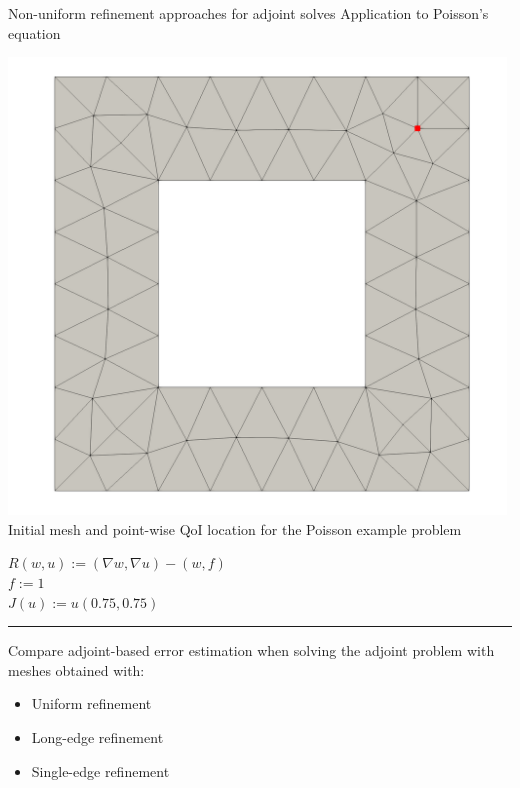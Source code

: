 \documentclass[fleqn]{beamer}
\begin{document}

\begin{frame}{Non-uniform refinement approaches for adjoint solves}
{Application to Poisson's equation}
\begin{minipage}{0.5\textwidth}
\centering
\includegraphics[width=0.99\textwidth]{../img/refine_squarehole_initial} \\
Initial mesh and point-wise QoI location for the Poisson example
problem
\end{minipage}%
\begin{minipage}{0.5\textwidth}
$R(w,u) := (\nabla w, \nabla u) - (w, f)$ \\ [8pt]
$f := 1$ \\ [8pt]
$J(u) := u(0.75, 0.75)$  \\ [8pt]
\hrule
\vspace{1em}
Compare adjoint-based error estimation when solving the adjoint
problem with meshes obtained with:
\begin{itemize}
\item Uniform refinement
\item Long-edge refinement
\item Single-edge refinement
\end{itemize}
\end{minipage}
\end{frame}
\end{document}
